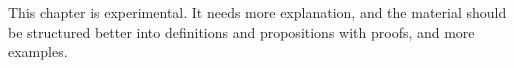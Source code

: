 \documentclass[../../../include/open-logic-chapter]{subfiles}
\begin{document}

\begin{editorial}
  This chapter is experimental. It needs more explanation, and the
  material should be structured better into definitions and
  propositions with proofs, and more examples.
\end{editorial}











\OLEndChapterHook
\end{document}
